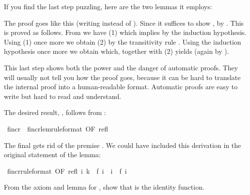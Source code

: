 \begin{isabellebody}
%
\begin{isamarkuptext}%
\noindent
If you find the last step puzzling, here are the two lemmas it employs:
\begin{isabelle}
\isanewline
{}
\end{isabelle}
%
The proof goes like this (writing  instead of ).
Since  it suffices to show
\hbox{},
by \@.  This is
proved as follows. From  we have 
(1) which implies  by the induction hypothesis.
Using (1) once more we obtain  (2) by the transitivity
rule .
Using the induction hypothesis once more we obtain 
which, together with (2) yields  (again by
).

This last step shows both the power and the danger of automatic proofs.  They
will usually not tell you how the proof goes, because it can be hard to
translate the internal proof into a human-readable format.  Automatic
proofs are easy to write but hard to read and understand.

The desired result, , follows from :%
\end{isamarkuptext}%
\isamarkuptrue%
\ f{\isacharunderscore}incr\ {\isacharequal}\ f{\isacharunderscore}incr{\isacharunderscore}lem{\isacharbrackleft}rule{\isacharunderscore}format{\isacharcomma}\ OF\ refl{\isacharbrackright}\isamarkupfalse%
%
\begin{isamarkuptext}%
\noindent
The final  gets rid of the premise . 
We could have included this derivation in the original statement of the lemma:%
\end{isamarkuptext}%
\isamarkuptrue%
\ f{\isacharunderscore}incr{\isacharbrackleft}rule{\isacharunderscore}format{\isacharcomma}\ OF\ refl{\isacharbrackright}{\isacharcolon}\ {\isachardoublequote}{\isasymforall}i{\isachardot}\ k\ {\isacharequal}\ f\ i\ {\isasymlongrightarrow}\ i\ {\isasymle}\ f\ i{\isachardoublequote}\isamarkupfalse%
\isamarkupfalse%
%
\begin{isamarkuptext}%
\begin{exercise}
From the axiom and lemma for , show that  is the
identity function.
\end{exercise}


\end{isamarkuptext}
\end{isabellebody}
